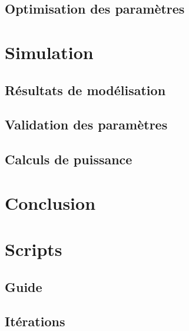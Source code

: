 \documentclass[a4paper,11pt]{report}
\begin{document}
\section{Optimisation des paramètres}
\chapter{Simulation}
\section{Résultats de modélisation}
\section{Validation des paramètres}
\section{Calculs de puissance}
\chapter*{Conclusion}

\appendix
\chapter{Scripts}
\section{Guide}
\section{Itérations}



\end{document}
